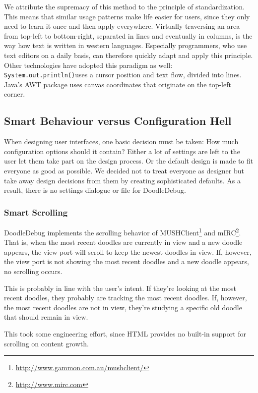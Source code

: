 \documentclass[english]{acm_proc_article-sp}
\newcommand\nes[1]{\nbc{nes}{#1}{blue}}
\begin{document}
We attribute the supremacy of this method to the principle of standardization\cite[pp. 
200--203]{Norm88a}. 
This means that similar usage patterns make life easier for users, since they only need to learn it once and then apply everywhere. 
Virtually traversing an area from top-left to bottom-right, separated in lines and eventually in columns, is the way how text is written in western languages. 
Especially programmers, who use text editors on a daily basis, can therefore quickly adapt and apply this principle. 
Other technologies have adopted this paradigm as well: \texttt{System.out.println()}uses a cursor position and text flow, divided into lines. 
Java's AWT package uses canvas coordinates that originate on the top-left corner.

\subsection{Smart Behaviour versus Configuration Hell}
When designing user interfaces, one basic decision must be taken: How much configuration options should it contain? Either a lot of settings are left to the user let them take part on the design process. 
Or the default design is made to fit everyone as good as possible. 
We decided not to treat everyone as designer
\cite[pp95ff]{Buxt07a}
\cite[p155]{Norm88a}
but take away design decisions from them by creating sophisticated defaults.
As a result, there is no settings dialogue or file for DoodleDebug. 
\nes{Nice!}
\subsubsection{Smart Scrolling}
DoodleDebug implements the scrolling behavior of MUSHClient\footnote{\url{http://www.gammon.com.au/mushclient/}} and mIRC\footnote{\url{http://www.mirc.com}}. 
That is, when the most recent doodles are currently in view and a new doodle appears, the view port will scroll to keep the newest doodles in view. 
If, however, the view port is not showing the most recent doodles and a new doodle appears, no scrolling occurs. 

This is probably in line with the user's intent. 
If they're looking at the most recent doodles, they probably are tracking the most recent doodles. 
If, however, the most recent doodles are not in view, they're studying a specific old doodle that should remain in view. 

This took some engineering effort, since HTML provides no built-in support for scrolling on content growth.
\end{document}
